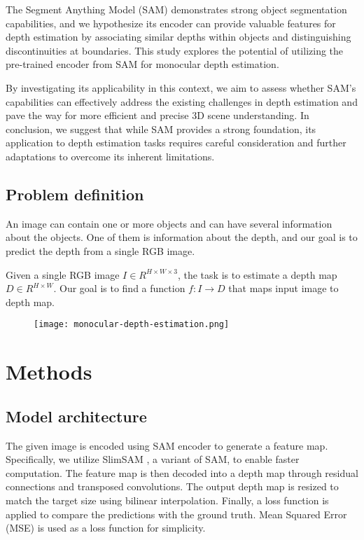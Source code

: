\documentclass{article}
\begin{document}
The Segment Anything Model (SAM) \cite{SAM} demonstrates strong object segmentation capabilities, and we hypothesize its encoder can provide valuable features for depth estimation by associating similar depths within objects and distinguishing discontinuities at boundaries. This study explores the potential of utilizing the pre-trained encoder from SAM for monocular depth estimation.

By investigating its applicability in this context, we aim to assess whether SAM's capabilities can effectively address the existing challenges in depth estimation and pave the way for more efficient and precise 3D scene understanding. In conclusion, we suggest that while SAM provides a strong foundation, its application to depth estimation tasks requires careful consideration and further adaptations to overcome its inherent limitations.

\subsection{Problem definition}

An image can contain one or more objects and can have several information about the objects. One of them is information about the depth, and our goal is to predict the depth from a single RGB image.

Given a single RGB image $ I \in R^{ H \times W \times 3 } $, the task is to estimate a depth map $ D \in R^{ H \times W } $. Our goal is to find a function $ f: I \rightarrow D $ that maps input image to depth map.

\begin{figure}[ht]
\centering
\texttt{[image: monocular-depth-estimation.png]}
\label{fig:model-comparison}
\end{figure}

\section{Methods}

\subsection{Model architecture}

The given image is encoded using SAM encoder to generate a feature map. Specifically, we utilize SlimSAM \cite{SlimSAM}, a variant of SAM, to enable faster computation. The feature map is then decoded into a depth map through residual connections and transposed convolutions. The output depth map is resized to match the target size using bilinear interpolation. Finally, a loss function is applied to compare the predictions with the ground truth. Mean Squared Error (MSE) is used as a loss function for simplicity.
\end{document}
